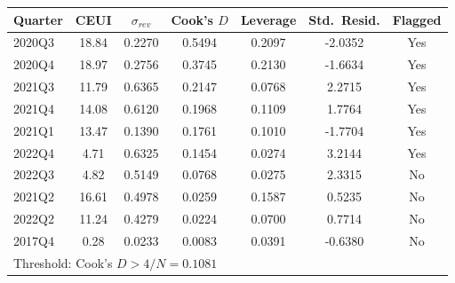 \begin{tabular}{lcccccc}
\toprule
Quarter & CEUI & $\sigma_{rev}$ & Cook's $D$ & Leverage & Std.\ Resid. & Flagged \\
\midrule
2020Q3 & 18.84 & 0.2270 & 0.5494 & 0.2097 & -2.0352 & Yes \\
2020Q4 & 18.97 & 0.2756 & 0.3745 & 0.2130 & -1.6634 & Yes \\
2021Q3 & 11.79 & 0.6365 & 0.2147 & 0.0768 & 2.2715 & Yes \\
2021Q4 & 14.08 & 0.6120 & 0.1968 & 0.1109 & 1.7764 & Yes \\
2021Q1 & 13.47 & 0.1390 & 0.1761 & 0.1010 & -1.7704 & Yes \\
2022Q4 & 4.71 & 0.6325 & 0.1454 & 0.0274 & 3.2144 & Yes \\
2022Q3 & 4.82 & 0.5149 & 0.0768 & 0.0275 & 2.3315 & No \\
2021Q2 & 16.61 & 0.4978 & 0.0259 & 0.1587 & 0.5235 & No \\
2022Q2 & 11.24 & 0.4279 & 0.0224 & 0.0700 & 0.7714 & No \\
2017Q4 & 0.28 & 0.0233 & 0.0083 & 0.0391 & -0.6380 & No \\
\midrule
\multicolumn{7}{l}{Threshold: Cook's $D > 4/N = 0.1081$}\\
\bottomrule
\end{tabular}
